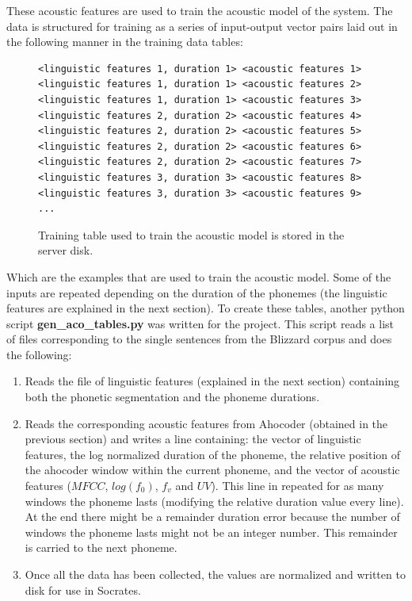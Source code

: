 These acoustic features are used to train the acoustic model of the system. The data is structured for training as a series of input-output vector pairs laid out in the following manner in the training data tables:

\begin{figure}[h]
\begin{lstlisting}
<linguistic features 1, duration 1> <acoustic features 1>
<linguistic features 1, duration 1> <acoustic features 2>
<linguistic features 1, duration 1> <acoustic features 3>
<linguistic features 2, duration 2> <acoustic features 4>
<linguistic features 2, duration 2> <acoustic features 5>
<linguistic features 2, duration 2> <acoustic features 6>
<linguistic features 2, duration 2> <acoustic features 7>
<linguistic features 3, duration 3> <acoustic features 8>
<linguistic features 3, duration 3> <acoustic features 9>
...
\end{lstlisting}
\caption{Training table used to train the acoustic model is stored in the server disk.}
\end{figure}

Which are the examples that are used to train the acoustic model. Some of the inputs are repeated depending on the duration of the phonemes (the linguistic features are explained in the next section). To create these tables, another python script \textbf{gen\_aco\_tables.py} was written for the project. This script reads a list of files corresponding to the single sentences from the Blizzard corpus and does the following:
\begin{enumerate}
    \item Reads the file of linguistic features (explained in the next section) containing both the phonetic segmentation and the phoneme durations.
    \item Reads the corresponding acoustic features from Ahocoder (obtained in the previous section) and writes a line containing: the vector of linguistic features, the log normalized duration of the phoneme, the relative position of the ahocoder window within the current phoneme, and the vector of acoustic features ($MFCC$, $log(f_0)$, $f_v$ and $UV$). This line in repeated for as many windows the phoneme lasts (modifying the relative duration value every line). At the end there might be a remainder duration error because the number of windows the phoneme lasts might not be an integer number. This remainder is carried to the next phoneme.
    \item Once all the data has been collected, the values are normalized and written to disk for use in Socrates.
\end{enumerate}

